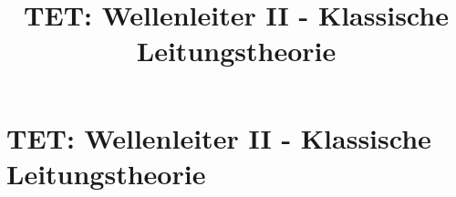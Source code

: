 
\usepackage{tikz-3dplot}
\usetikzlibrary{shapes.geometric}
\usepackage{pgfplots}
\pgfplotsset{compat = newest}
\usepackage[europeanresistors,americaninductors]{circuitikz}

\title[TET: Wellenleiter II - Klassische Leitungstheorie]{TET: Wellenleiter II - Klassische Leitungstheorie}


% 
% 

\maketitle

% 
% 
\section{TET: Wellenleiter II - Klassische Leitungstheorie}

